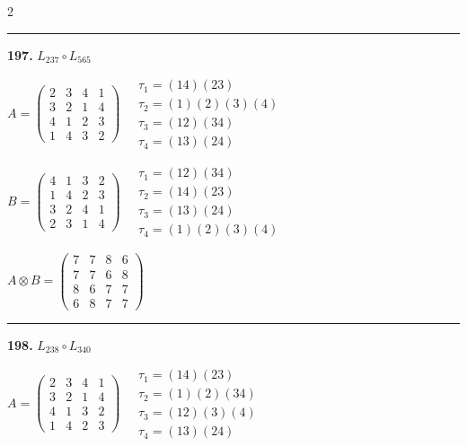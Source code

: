 \begin{multicols}{2}
\vspace{0.3em}
\hrule
\vspace{0.3em}

\noindent\textbf{197.} $L_{237} \circ L_{565}$

$A = \begin{pmatrix} 2 & 3 & 4 & 1 \\ 3 & 2 & 1 & 4 \\ 4 & 1 & 2 & 3 \\ 1 & 4 & 3 & 2 \end{pmatrix} \quad \begin{matrix} \tau_{1}=(1 4)(2 3) \\ \tau_{2}=(1)(2)(3)(4) \\ \tau_{3}=(1 2)(3 4) \\ \tau_{4}=(1 3)(2 4) \end{matrix}$

$B = \begin{pmatrix} 4 & 1 & 3 & 2 \\ 1 & 4 & 2 & 3 \\ 3 & 2 & 4 & 1 \\ 2 & 3 & 1 & 4 \end{pmatrix} \quad \begin{matrix} \tau_{1}=(1 2)(3 4) \\ \tau_{2}=(1 4)(2 3) \\ \tau_{3}=(1 3)(2 4) \\ \tau_{4}=(1)(2)(3)(4) \end{matrix}$

$A \otimes B = \begin{pmatrix} 7 & 7 & 8 & 6 \\ 7 & 7 & 6 & 8 \\ 8 & 6 & 7 & 7 \\ 6 & 8 & 7 & 7 \end{pmatrix}$

\vspace{0.3em}
\hrule
\vspace{0.3em}

\noindent\textbf{198.} $L_{238} \circ L_{340}$

$A = \begin{pmatrix} 2 & 3 & 4 & 1 \\ 3 & 2 & 1 & 4 \\ 4 & 1 & 3 & 2 \\ 1 & 4 & 2 & 3 \end{pmatrix} \quad \begin{matrix} \tau_{1}=(1 4)(2 3) \\ \tau_{2}=(1)(2)(3 4) \\ \tau_{3}=(1 2)(3)(4) \\ \tau_{4}=(1 3)(2 4) \end{matrix}$


\end{multicols}
